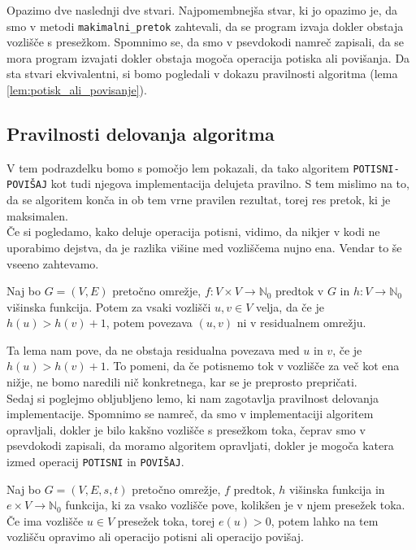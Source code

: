 \documentclass[mat1]{fmfdelo}
\newcommand{\N}{\mathbb N}
\begin{document}
Opazimo dve naslednji dve stvari. Najpomembnejša stvar, ki jo opazimo je, da smo v metodi \texttt{makimalni\_pretok} zahtevali, da se program izvaja dokler obstaja vozlišče s presežkom. Spomnimo se, da smo v psevdokodi namreč zapisali, da se mora program izvajati dokler obstaja mogoča operacija potiska ali povišanja. Da sta stvari ekvivalentni, si bomo pogledali v dokazu pravilnosti algoritma (lema \ref{lem:potisk_ali_povisanje}).



\subsection{Pravilnosti delovanja algoritma}

V tem podrazdelku bomo s pomočjo lem pokazali, da tako algoritem \texttt{POTISNI-POVIŠAJ} kot tudi njegova implementacija delujeta pravilno. S tem mislimo na to, da se algoritem konča in ob tem vrne pravilen rezultat, torej res pretok, ki je maksimalen.\\

Če si pogledamo, kako deluje operacija potisni, vidimo, da nikjer v kodi ne uporabimo dejstva, da je razlika višine med vozliščema nujno ena. Vendar to še vseeno zahtevamo.

\begin{lema}
Naj bo $G = (V,E)$ pretočno omrežje, $f\colon V \times V \rightarrow \N_0$ predtok v $G$ in $h\colon V \rightarrow \N_0$ višinska funkcija. Potem za vsaki vozlišči $u,v \in V$ velja, da če je $h(u) > h(v) + 1$, potem povezava $(u,v)$ ni v residualnem omrežju.
\end{lema}

Ta lema nam pove, da ne obstaja residualna povezava med $u$ in $v$, če je $h(u) > h(v) + 1$. To pomeni, da če potisnemo tok v vozlišče za več kot ena nižje, ne bomo naredili nič konkretnega, kar se je preprosto prepričati.\\


Sedaj si poglejmo obljubljeno lemo, ki nam zagotavlja pravilnost delovanja implementacije. Spomnimo se namreč, da smo v implementaciji algoritem opravljali, dokler je bilo kakšno vozlišče s presežkom toka, čeprav smo v psevdokodi zapisali, da moramo algoritem opravljati, dokler je mogoča katera izmed operacij \texttt{POTISNI} in \texttt{POVIŠAJ}.

\begin{lema}\label{lem:potisk_ali_povisanje}
Naj bo $G=(V,E,s,t)$ pretočno omrežje, $f$ predtok, $h$ višinska funkcija in $e\times V \rightarrow \N_0$ funkcija, ki za vsako vozlišče pove, kolikšen je v njem presežek toka. Če ima vozlišče $u\in V$ presežek toka, torej $e(u) > 0$, potem lahko na tem vozlišču opravimo ali operacijo potisni ali operacijo povišaj.
\end{lema}
\end{document}
